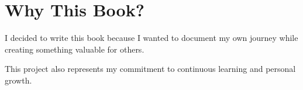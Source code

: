 \section{Why This Book?}

I decided to write this book because I wanted to document my own journey while creating something valuable for others.

This project also represents my commitment to continuous learning and personal growth.